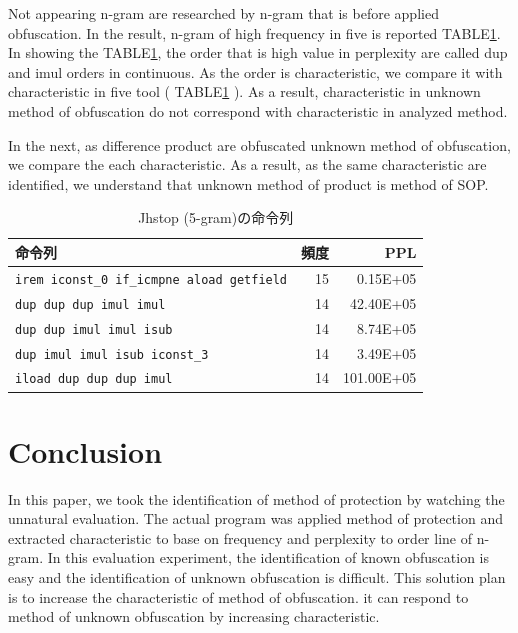 \documentclass[conference]{IEEEtran}
\begin{document}
Not appearing n-gram are researched by n-gram that is before applied
obfuscation.  In the result, n-gram of high frequency in five is
reported TABLE\ref{table:jhstop}.  In showing the
TABLE\ref{table:jhstop}, the order that is high value in perplexity
are called dup and imul orders in continuous.  As the order is
characteristic, we compare it with characteristic in five tool (
TABLE\ref{table:jhstop} ).  As a result, characteristic in unknown
method of obfuscation do not correspond with characteristic in
analyzed method.

In the next, as difference product are obfuscated unknown method of
obfuscation, we compare the each characteristic.  As a result, as the
same characteristic are identified, we understand that unknown method
of product is method of SOP.


\begin{table}[t]
  \centering
  \footnotesize{
    \caption{Jhstop (5-gram)の命令列}\label{table:jhstop}
  \begin{tabular}{l|r|r}
   命令列 & 頻度 & PPL\\ \hline
    \texttt{irem iconst\_0 if\_icmpne aload getfield} & 15 &   0.15E+05 \\
    \texttt{dup dup dup imul imul}                    & 14 &  42.40E+05 \\
    \texttt{dup dup imul imul isub}                   & 14 &   8.74E+05 \\
    \texttt{dup imul imul isub iconst\_3}             & 14 &   3.49E+05 \\
    \texttt{iload dup dup dup imul}                   & 14 & 101.00E+05 \\
    \end{tabular}}
\end{table}


\section{Conclusion}\label{sect:conclusion}

In this paper, we took the identification of method of protection by
watching the unnatural evaluation.  The actual program was applied
method of protection and extracted characteristic to base on frequency
and perplexity to order line of n-gram.  In this evaluation
experiment, the identification of known obfuscation is easy and the
identification of unknown obfuscation is difficult.  This solution
plan is to increase the characteristic of method of obfuscation.  it
can respond to method of unknown obfuscation by increasing
characteristic.





\end{document}
